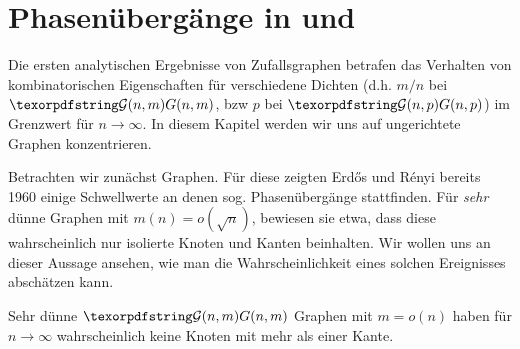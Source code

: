 \section{Phasenübergänge in \Gnp und \Gnm}
Die ersten analytischen Ergebnisse von Zufallsgraphen betrafen das Verhalten von kombinatorischen Eigenschaften für verschiedene Dichten (d.h. $m/n$ bei $\Gnm$, bzw $p$ bei $\Gnp$) im Grenzwert für $n \to \infty$.
In  diesem Kapitel werden wir uns auf ungerichtete Graphen konzentrieren.

Betrachten wir zunächst \Gnm Graphen.
Für diese zeigten Erd\H{o}s und R\'enyi bereits 1960 einige Schwellwerte an denen sog. Phasenübergänge stattfinden.
Für \emph{sehr} dünne Graphen mit $m(n) = o(\sqrt n)$, bewiesen sie etwa, dass diese wahrscheinlich nur isolierte Knoten und Kanten beinhalten.
Wir wollen uns an dieser Aussage ansehen, wie man die Wahrscheinlichkeit eines solchen Ereignisses abschätzen kann.

\begin{lemma}
    Sehr dünne $\Gnm$ Graphen mit $m = o(n)$ haben für $n \to \infty$ wahrscheinlich keine Knoten mit mehr als einer Kante.
\end{lemma}

